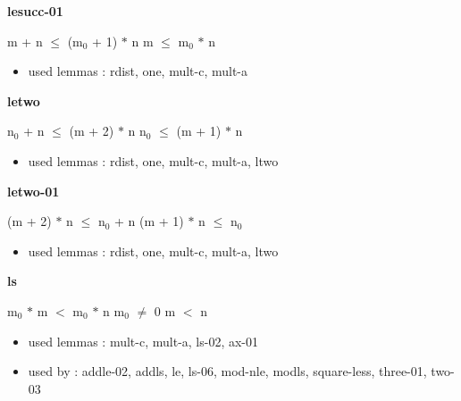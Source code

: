 \documentclass[a4paper]{article}
\begin{document}
{\large\bf lesucc-01}

\medskip

 \Fol m + n $\le$ ($\mbox{m}_{0}$ + 1) $*$ n \Equiv m $\le$ $\mbox{m}_{0}$ $*$ n

\begin{itemize}


\item       used lemmas  : rdist, one, mult-c, mult-a

\end{itemize}

\medskip

\bigskip

{\large\bf letwo}

\medskip

 \Fol $\mbox{n}_{0}$ + n $\le$ (m + 2) $*$ n \Equiv $\mbox{n}_{0}$ $\le$ (m + 1) $*$ n

\begin{itemize}


\item       used lemmas  : rdist, one, mult-c, mult-a, ltwo

\end{itemize}

\medskip

\bigskip

{\large\bf letwo-01}

\medskip

 \Fol (m + 2) $*$ n $\le$ $\mbox{n}_{0}$ + n \Equiv (m + 1) $*$ n $\le$ $\mbox{n}_{0}$

\begin{itemize}


\item       used lemmas  : rdist, one, mult-c, mult-a, ltwo

\end{itemize}

\medskip

\bigskip

{\large\bf ls}

\medskip

 \Fol $\mbox{m}_{0}$ $*$ m $<$ $\mbox{m}_{0}$ $*$ n \Equiv $\mbox{m}_{0}$ $\neq$ 0 \And m $<$ n

\begin{itemize}


\item       used lemmas  : mult-c, mult-a, ls-02, ax-01
\item       used by      : addle-02, addls, le, ls-06, mod-nle, modls, square-less, three-01, two-03

\end{itemize}
\end{document}
